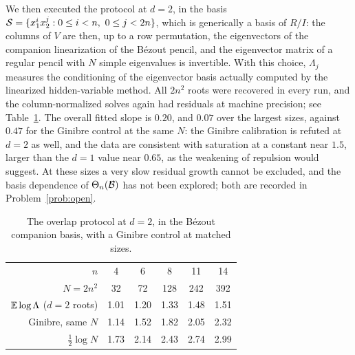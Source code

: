 We then executed the protocol at $d=2$, in the basis
$\mathcal{S} = \{x_1^ix_2^j : 0\le i<n,\ 0\le j<2n\}$, which is generically a basis of $R/I$: the
columns of $V$ are then, up to a row permutation, the eigenvectors of the companion
linearization of the B\'ezout pencil, and the eigenvector matrix of a regular pencil with
$N$ simple eigenvalues is invertible. With this choice, $\Lambda_j$ measures the
conditioning of the eigenvector basis actually computed by the linearized hidden-variable
method. All $2n^2$ roots were recovered in every run, and the column-normalized solves again
had residuals at machine precision; see Table~\ref{tab:overlap2}. The overall fitted slope
is $0.20$, and $0.07$ over the largest sizes, against $0.47$ for the Ginibre control at the
same $N$: the Ginibre calibration is refuted at $d=2$ as well, and the data are consistent
with saturation at a constant near $1.5$, larger than the $d=1$ value near $0.65$, as the
weakening of repulsion would suggest. At these sizes a very slow residual growth cannot be
excluded, and the basis dependence of $\Theta_n(\mathcal{B})$ has not been explored; both are
recorded in Problem~\ref{prob:open}.

\begin{table}[ht]
  \centering
  \begin{tabular}{r|ccccc}
    $n$ & 4 & 6 & 8 & 11 & 14 \\
    $N=2n^2$ & 32 & 72 & 128 & 242 & 392 \\
    \hline
    $\mathbb{E}\log\Lambda$ ($d=2$ roots) & 1.01 & 1.20 & 1.33 & 1.48 & 1.51 \\
    Ginibre, same $N$ & 1.14 & 1.52 & 1.82 & 2.05 & 2.32 \\
    $\frac12\log N$ & 1.73 & 2.14 & 2.43 & 2.74 & 2.99
  \end{tabular}
  \caption{The overlap protocol at $d=2$, in the B\'ezout companion basis, with a Ginibre
    control at matched sizes.}
  \label{tab:overlap2}
\end{table}

